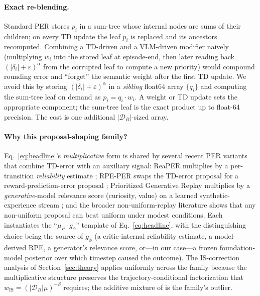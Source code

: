 \documentclass{article}
\begin{document}
\paragraph{Exact re-blending.}
Standard PER stores $p_i$ in a sum-tree whose internal nodes are sums of
their children; on every TD update the leaf $p_i$ is replaced and its
ancestors recomputed. Combining a TD-driven and a VLM-driven modifier
naively (multiplying $w_i$ into the stored leaf at episode-end, then later
reading back $(|\delta_i|\!+\!\varepsilon)^\alpha$ from the corrupted leaf
to compute a new priority) would compound rounding error and ``forget'' the
semantic weight after the first TD update. We avoid this by storing
$(|\delta_i|\!+\!\varepsilon)^\alpha$ in a \emph{sibling} float64 array
$\{q_i\}$ and computing the sum-tree leaf on demand as $p_i = q_i\cdot w_i$.
A weight or TD update sets the appropriate component; the sum-tree leaf is
the exact product up to float-64 precision. The cost is one additional
$|\mathcal{D}_B|$-sized array.

\paragraph{Why this proposal-shaping family?}
Eq.~\eqref{eq:headline}'s \emph{multiplicative} form is shared by several
recent PER variants that combine TD-error with an auxiliary signal: ReaPER
multiplies by a per-transition \emph{reliability} estimate
\citep{pleiss2025reaper}; RPE-PER swaps the TD-error proposal for a
reward-prediction-error proposal \citep{yamani2025rpeper}; Prioritized
Generative Replay multiplies by a \emph{generative}-model relevance score
(curiosity, value) on a learned synthetic-experience stream
\citep{wang2025prioritizedgenerative}; and the broader non-uniform-replay
literature \citep{krutsylo2025nonuniform} shows that any non-uniform
proposal can beat uniform under modest conditions. Each instantiates the
``$\mu_P \cdot g_\phi$'' template of Eq.~\eqref{eq:headline}, with the
distinguishing choice being the source of $g_\phi$ (a critic-internal
reliability estimate, a model-derived RPE, a generator's relevance score,
or---in our case---a frozen foundation-model posterior over which timestep
caused the outcome). The IS-correction analysis of Section~\ref{sec:theory}
applies uniformly across the family because the multiplicative structure
preserves the trajectory-conditional factorization that
$w_{\text{IS}}\!=\!(|\mathcal{D}_B|\mu)^{-\beta}$ requires; the additive
mixture of \citet{sharony2026vlmrb} is the family's outlier.
\end{document}
